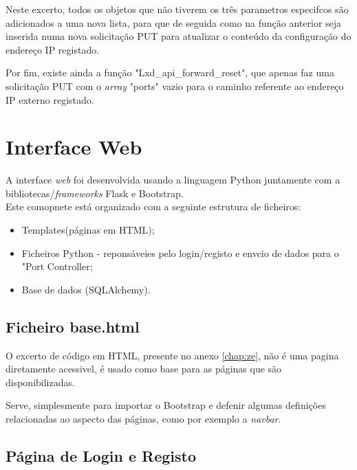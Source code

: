 Neste excerto, todos os objetos que não tiverem os três parametros especifcos são adicionados
a uma nova lista, para que de seguida como na função anterior seja inserida numa nova
solicitação PUT para atualizar o conteúdo da configuração do endereço IP registado.

Por fim, existe ainda a função "Lxd\_api\_forward\_reset", que apenas faz uma solicitação
PUT com o \textit{array} "ports" vazio para o caminho referente ao endereço IP
externo registado. \\




\section{Interface Web}

A interface \textit{web} foi desenvolvida usando a linguagem Python juntamente com
a bibliotecas/\textit{frameworks} Flask e Bootstrap. \\

Este comopnete está organizado com a seguinte estrutura de ficheiros:
\begin{itemize}
    \item Templates(páginas em HTML);
    \item Ficheiros Python - reponsáveies pelo login/registo e envcio de dados para o "Port Controller;
    \item Base de dados (SQLAlchemy).
\end{itemize}



\subsection{Ficheiro base.html}

O excerto de código em HTML, presente no anexo \ref{chap:ze}, não é uma pagina diretamente acessivel, é 
usado como base para as páginas que são disponibilizadas.

Serve, simplesmente para importar o Bootstrap e defenir algumas definições
relacionadas ao aspecto das páginas, como por exemplo a \textit{navbar}.



\subsection{Página de Login e Registo}

